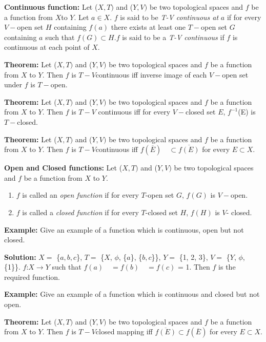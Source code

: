 \documentclass[12pt]{amsart}
\begin{document}
\textbf{Continuous function:} Let ($X, T)$ and ($Y, V)$ be two topological spaces and 
$f$ be a function from $X $to $Y$. Let $a\in X$. $f$ is said to be \textit{T-V continuous at} $a$ if for every $V-$open set 
$H$ containing $f (a)$ there exists at least one $T-$open set $G$ containing $a$ such that $f (G)\subset 
H. f$ is said to be a \textit{T-V continuous} if $f$ is continuous at each point of $X$.

\textbf{Theorem:} Let ($X, T )$ and ($Y, V )$ be two topological spaces and $f$ be a function 
from $X$ to $Y$. Then $f$ is $T-V $continuous iff inverse image of each $V-$open set under $f$ is 
$T-$open.

\textbf{Theorem:} Let ($X, T )$ and ($Y, V )$ be two topological spaces and $f$ be a function 
from $X$ to $Y$. Then $f$ is $T-V$ continuous iff for every $V- $closed set $E$, $f ^{-1}$(E) is $T- $closed.

\textbf{Theorem:} Let ($X, T )$ and ($Y, V )$ be two topological spaces and $f$ be a function 
from $X$ to $Y$. Then $f$ is $T-V $continuous iff $f (\overline E ) \quad \subset \overline 
{f(E)} $ for every $E \subset X$.

\textbf{Open and Closed functions:} Let ($X, T )$ and ($Y, V)$ be two topological spaces 
and $f$ be a function from $X$ to $Y$. 

\begin{enumerate}
\item $f$ is called an \textit{open function} if for every $T$-open set $G$, $f (G)$ is $V- $open.
\item $f$ is called a \textit{closed function} if for every $T$-closed set $H$, $f (H)$ is $V$- closed.
\end{enumerate}

\textbf{Example:} Give an example of a function which is continuous, open 
but not closed.

\textbf{Solution:} $X =$ {\{}$a, b, c${\}}, $T =$ {\{}$X$, $\phi $, {\{}$a${\}}, {\{}$b, c${\}}{\}}, $Y =$ 
{\{}1, 2, 3{\}}, $V =$ {\{}$Y$, $\phi $, {\{}1{\}}{\}}. $f$:$X\to Y$ such that $f(a) \quad = f(b) \quad = f(c)$ = 
1. Then $f$ is the required function.

\textbf{Example:} Give an example of a function which is continuous and 
closed but not open.

\textbf{Theorem:} Let ($X, T )$ and ($Y, V)$ be two topological spaces and $f$ be a function 
from $X$ to $Y$. Then $f$ is $T-V $closed mapping iff $\overline {f(E)} \subset 
f(\overline E )$ for every $E\subset X$.
\end{document}
